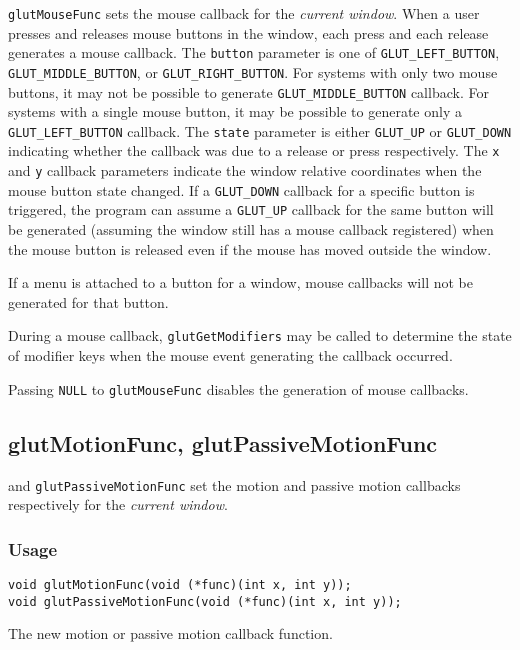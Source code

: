 {\tt glutMouseFunc} sets the mouse callback for the {\em current window}.
When a user presses and releases mouse buttons in the window, each press
and each release generates a mouse callback.  The {\tt button} parameter
is one of {\tt GLUT\_LEFT\_BUTTON}, {\tt GLUT\_MIDDLE\_BUTTON}, or
{\tt GLUT\_RIGHT\_BUTTON}.  For systems with only two mouse buttons, it may
not be possible to generate {\tt GLUT\_MIDDLE\_BUTTON} callback.  For systems
with a single mouse button, it may be possible to generate only a
{\tt GLUT\_LEFT\_BUTTON} callback.  The {\tt state} parameter is either
{\tt GLUT\_UP} or {\tt GLUT\_DOWN} indicating whether the callback
was due to a release or press respectively.  The {\tt x} and {\tt y} callback
parameters indicate the window relative coordinates when the mouse
button state changed.  If a {\tt GLUT\_DOWN} callback for a specific
button is triggered, the program can assume a {\tt GLUT\_UP} callback for the 
same button will be generated (assuming the window still has a mouse
callback registered) when the mouse button is released even if
the mouse has moved outside the window.

If a menu is attached to a button for a window, mouse callbacks will
not be generated for that button.

During a mouse callback, {\tt glutGetModifiers} may be called to determine
the state of modifier keys when the mouse event generating the
callback occurred.

Passing {\tt NULL} to {\tt glutMouseFunc} disables
the generation of mouse callbacks.

\subsection{glutMotionFunc, glutPassiveMotionFunc}

 and {\tt glutPassiveMotionFunc} set the motion and
passive motion callbacks respectively for the {\em current window}.

\subsubsection*{Usage}
\begin{verbatim}
void glutMotionFunc(void (*func)(int x, int y));
void glutPassiveMotionFunc(void (*func)(int x, int y));
\end{verbatim}
\begin{description}
\itemsep 0in
\item[{\tt func}]
The new motion or passive motion callback function.
\end{description}

